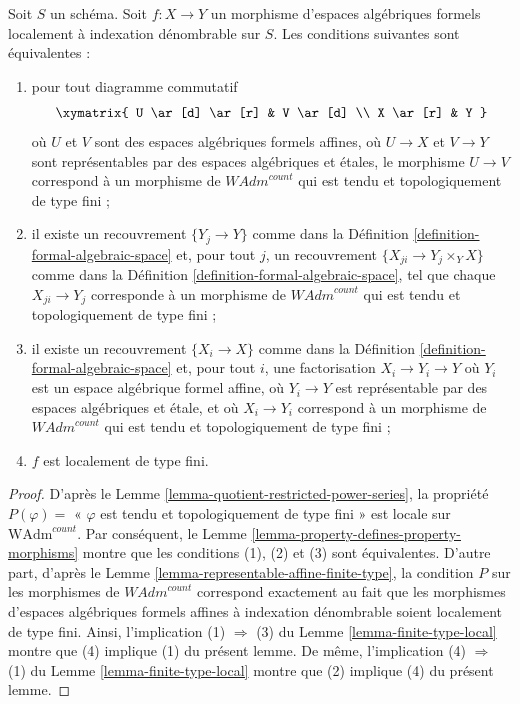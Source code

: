\begin{lemma}
\label{lemma-finite-type-local-property}
Soit $S$ un schéma. Soit $f : X \to Y$ un morphisme d'espaces algébriques formels
localement à indexation dénombrable sur $S$.
Les conditions suivantes sont équivalentes :
\begin{enumerate}
\item pour tout diagramme commutatif
$$
\xymatrix{
U \ar[d] \ar[r] & V \ar[d] \\
X \ar[r] & Y
}
$$
où $U$ et $V$ sont des espaces algébriques formels affines, où $U \to X$ et $V \to Y$
sont représentables par des espaces algébriques et étales, le morphisme $U \to V$
correspond à un morphisme de $\textit{WAdm}^{count}$ qui est
tendu et topologiquement de type fini ;
\item il existe un recouvrement $\{Y_j \to Y\}$ comme dans la
Définition \ref{definition-formal-algebraic-space} et, pour tout $j$,
un recouvrement $\{X_{ji} \to Y_j \times_Y X\}$ comme dans la
Définition \ref{definition-formal-algebraic-space},
tel que chaque $X_{ji} \to Y_j$ corresponde
à un morphisme de $\textit{WAdm}^{count}$ qui est
tendu et topologiquement de type fini ;
\item il existe un recouvrement $\{X_i \to X\}$ comme dans la
Définition \ref{definition-formal-algebraic-space}
et, pour tout $i$, une factorisation $X_i \to Y_i \to Y$ où $Y_i$
est un espace algébrique formel affine, où $Y_i \to Y$ est représentable
par des espaces algébriques et étale, et où $X_i \to Y_i$ correspond
à un morphisme de $\textit{WAdm}^{count}$ qui est
tendu et topologiquement de type fini ;
\item $f$ est localement de type fini.
\end{enumerate}
\end{lemma}

\begin{proof}
D'après le Lemme \ref{lemma-quotient-restricted-power-series},
la propriété
$P(\varphi)=$ « $\varphi$ est tendu et topologiquement de type fini »
est locale sur $\text{WAdm}^{count}$. Par conséquent, le
Lemme \ref{lemma-property-defines-property-morphisms}
montre que les conditions (1), (2) et (3) sont équivalentes.
D'autre part, d'après le Lemme \ref{lemma-representable-affine-finite-type},
la condition $P$ sur les morphismes de $\textit{WAdm}^{count}$
correspond exactement au fait que les morphismes d'espaces algébriques formels
affines à indexation dénombrable soient localement de type fini.
Ainsi, l'implication (1) $\Rightarrow$ (3) du
Lemme \ref{lemma-finite-type-local}
montre que (4) implique (1) du présent lemme.
De même, l'implication (4) $\Rightarrow$ (1) du
Lemme \ref{lemma-finite-type-local}
montre que (2) implique (4) du présent lemme.
\end{proof}







